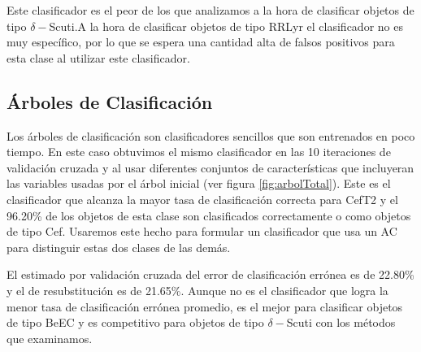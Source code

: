 \documentclass[letterpaper,12pt]{book}
\begin{document}
Este clasificador es el peor de los que analizamos a la hora de clasificar objetos de tipo $\delta-$Scuti.A la hora de clasificar objetos de tipo RRLyr el clasificador no es muy específico, por lo que se espera una cantidad alta de falsos positivos para esta clase al utilizar este clasificador.

\subsection{Árboles de Clasificación}

Los árboles de clasificación son clasificadores sencillos que son entrenados en poco tiempo. En este caso obtuvimos el mismo clasificador en las 10 iteraciones de validación cruzada y al usar diferentes conjuntos de características que incluyeran las variables usadas por el árbol inicial (ver figura \ref{fig:arbolTotal}).  Este es el clasificador que alcanza la mayor tasa de clasificación correcta para CefT2 y el 96.20\% de los objetos de esta clase son clasificados correctamente o como objetos de tipo Cef. Usaremos este hecho para formular un clasificador que usa un AC para distinguir estas dos clases de las demás.

El estimado por validación cruzada del error de clasificación errónea es de 22.80\% y el de resubstitución es de 21.65\%. Aunque no es el clasificador que logra la menor tasa de clasificación errónea promedio, es el mejor para clasificar objetos de tipo BeEC y es competitivo para objetos de tipo $\delta-$Scuti con los métodos que examinamos. 
\end{document}
